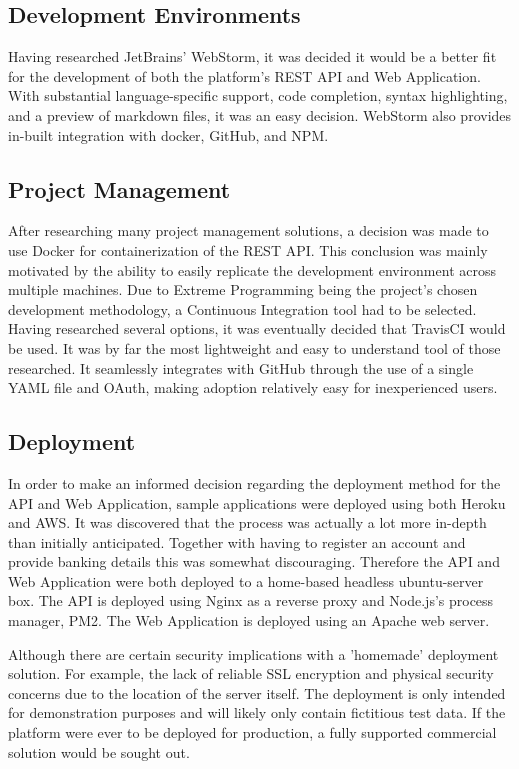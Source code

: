 \subsection{Development Environments}
Having researched JetBrains' WebStorm, it was decided it would be a better fit for the development of both the platform's REST API and Web Application. With substantial language-specific support, code completion, syntax highlighting, and a preview of markdown files, it was an easy decision. WebStorm also provides in-built integration with docker, GitHub, and NPM.

\subsection{Project Management}
After researching many project management solutions, a decision was made to use Docker for containerization of the REST API. This conclusion was mainly motivated by the ability to easily replicate the development environment across multiple machines. Due to Extreme Programming being the project's chosen development methodology, a Continuous Integration tool had to be selected. Having researched several options, it was eventually decided that TravisCI would be used. It was by far the most lightweight and easy to understand tool of those researched. It seamlessly integrates with GitHub through the use of a single YAML file and OAuth, making adoption relatively easy for inexperienced users.

\subsection{Deployment}
In order to make an informed decision regarding the deployment method for the API and Web Application, sample applications were deployed using both Heroku and AWS. It was discovered that the process was actually a lot more in-depth than initially anticipated. Together with having to register an account and provide banking details this was somewhat discouraging. Therefore the API and Web Application were both deployed to a home-based headless ubuntu-server box. The API is deployed using Nginx as a reverse proxy and Node.js's process manager, PM2. The Web Application is deployed using an Apache web server.

Although there are certain security implications with a 'homemade' deployment solution.  For example, the lack of reliable SSL encryption and physical security concerns due to the location of the server itself. The deployment is only intended for demonstration purposes and will likely only contain fictitious test data. If the platform were ever to be deployed for production, a fully supported commercial solution would be sought out.





